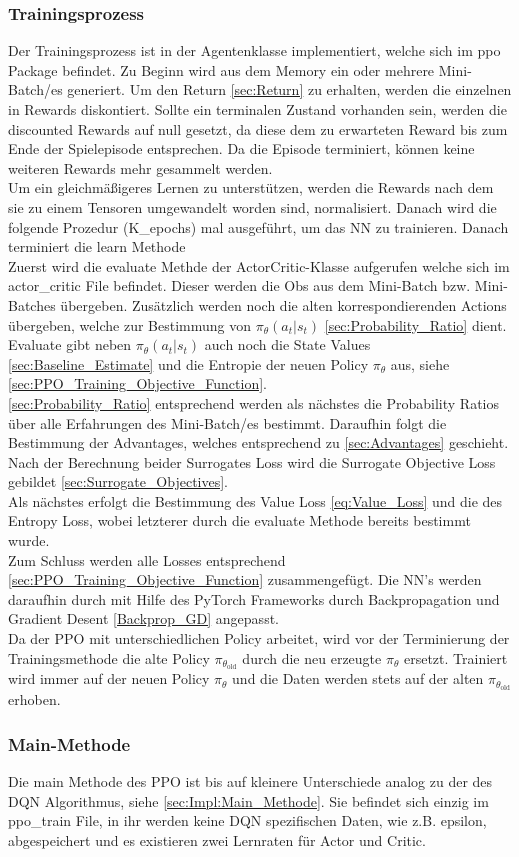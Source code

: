 \subsubsection{Trainingsprozess}
Der Trainingsprozess ist in der Agentenklasse implementiert, welche sich im ppo Package befindet. Zu Beginn wird aus dem Memory ein oder mehrere Mini-Batch/es generiert. Um den Return \ref{sec:Return} zu erhalten, werden die einzelnen in Rewards diskontiert. Sollte ein terminalen Zustand vorhanden sein, werden die discounted Rewards auf null gesetzt, da diese dem zu erwarteten Reward bis zum Ende der Spielepisode entsprechen. Da die Episode terminiert, können keine weiteren Rewards mehr gesammelt werden.\\
Um ein gleichmäßigeres Lernen zu unterstützen, werden die Rewards nach dem sie zu einem Tensoren umgewandelt worden sind, normalisiert. Danach wird die folgende Prozedur (K\_epochs) mal ausgeführt, um das NN zu trainieren. Danach terminiert die learn Methode\\
Zuerst wird die evaluate Methde der ActorCritic-Klasse aufgerufen welche sich im actor\_critic File befindet. Dieser werden die Obs aus dem Mini-Batch bzw. Mini-Batches übergeben. Zusätzlich werden noch die alten korrespondierenden Actions übergeben, welche zur Bestimmung von $\pi_{\theta}(a_{t}|s_{t})$ \ref{sec:Probability_Ratio} dient. Evaluate gibt neben $\pi_{\theta}(a_{t}|s_{t})$ auch noch die State Values \ref{sec:Baseline_Estimate} und die Entropie der neuen Policy $\pi_{\theta}$ aus, siehe \ref{sec:PPO_Training_Objective_Function}.\\
\ref{sec:Probability_Ratio} entsprechend werden als nächstes die Probability Ratios über alle Erfahrungen des Mini-Batch/es bestimmt. Daraufhin folgt die Bestimmung der Advantages, welches entsprechend zu \ref{sec:Advantages} geschieht. Nach der Berechnung beider Surrogates Loss wird die Surrogate Objective Loss gebildet \ref{sec:Surrogate_Objectives}.\\
Als nächstes erfolgt die Bestimmung des Value Loss \ref{eq:Value_Loss} und die des Entropy Loss, wobei letzterer durch die evaluate Methode bereits bestimmt wurde.\\
Zum Schluss werden alle Losses entsprechend \ref{sec:PPO_Training_Objective_Function} zusammengefügt. Die NN's werden daraufhin durch mit Hilfe des PyTorch Frameworks durch Backpropagation und Gradient Desent \ref{Backprop_GD} angepasst.\\
Da der PPO mit unterschiedlichen Policy arbeitet, wird vor der Terminierung der Trainingsmethode die alte Policy $\pi_{\theta_{\text{old}}}$ durch die neu erzeugte $\pi_{\theta}$ ersetzt. Trainiert wird immer auf der neuen Policy $\pi_{\theta}$ und die Daten werden stets auf der alten $\pi_{\theta_{\text{old}}}$ erhoben.

\subsubsection{Main-Methode}
Die main Methode des PPO ist bis auf kleinere Unterschiede analog zu der des DQN Algorithmus, siehe \ref{sec:Impl:Main_Methode}. Sie befindet sich einzig im ppo\_train File, in ihr werden keine DQN spezifischen Daten, wie z.B. epsilon, abgespeichert und es existieren zwei Lernraten für Actor und Critic. 
